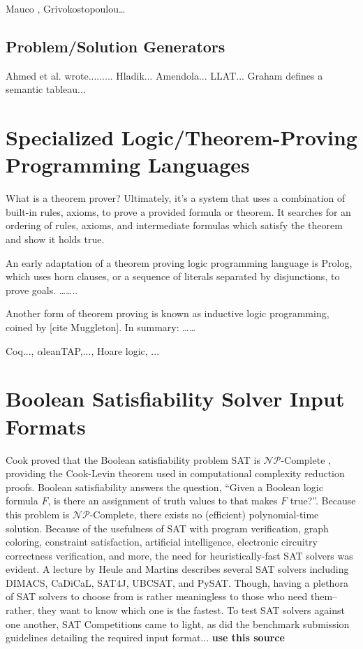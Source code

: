 \documentclass[ms]{uncgdissertationexp2}
\theoremstyle{plain}
\theoremstyle{definition}
\theoremstyle{remark}
\begin{document}
Mauco \cite{mauco}, Grivokostopoulou… \cite{grivokostopoulou}

\subsection{Problem/Solution Generators}
Ahmed et al. wrote.........
Hladik...
Amendola...
LLAT... Graham defines a semantic tableau...

\section{Specialized Logic/Theorem-Proving Programming Languages}
What is a theorem prover? Ultimately, it's a system that uses a combination of built-in rules, axioms, to prove a provided formula or theorem. It searches for an ordering of rules, axioms, and intermediate formulas which satisfy the theorem and show it holds true. 

An early adaptation of a theorem proving logic programming language is Prolog, which uses horn clauses, or a sequence of literals separated by disjunctions, to prove goals. ……..

Another form of theorem proving is known as inductive logic programming, coined by [cite Muggleton]. In summary: ……

Coq..., $\alpha$\textsf{lean}TAP,..., Hoare logic, ...

\section{Boolean Satisfiability Solver Input Formats} 
Cook proved that the Boolean satisfiability problem SAT is $\mathcal{NP}$-Complete \cite{cook}, providing the Cook-Levin theorem used in computational complexity reduction proofs. Boolean satisfiability answers the question, ``Given a Boolean logic formula $F$, is there an assignment of truth values to that makes $F$ true?''. Because this problem is $\mathcal{NP}$-Complete, there exists no (efficient) polynomial-time solution. Because of the usefulness of SAT with program verification, graph coloring, constraint satisfaction, artificial intelligence, electronic circuitry correctness verification, and more, the need for heuristically-fast SAT solvers was evident. A lecture by Heule and Martins \cite{satsolvers} describes several SAT solvers including DIMACS, CaDiCaL, SAT4J, UBCSAT, and PySAT. Though, having a plethora of SAT solvers to choose from is rather meaningless to those who need them--rather, they want to know which one is the fastest. To test SAT solvers against one another, SAT Competitions came to light, as did the benchmark submission guidelines detailing the required input format... \textbf{use this source \cite{satbenchmark}}
\end{document}
